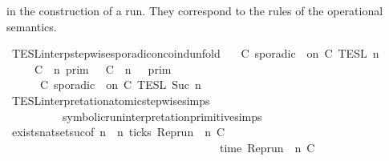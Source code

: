 \begin{isabellebody}
\begin{isamarkuptext}
  in the construction of a run. They correspond to the rules of the operational 
  semantics.%
\end{isamarkuptext}\isamarkuptrue%
\isamarkupfalse%
\ TESL{\isacharunderscore}interp{\isacharunderscore}stepwise{\isacharunderscore}sporadicon{\isacharunderscore}coind{\isacharunderscore}unfold{\isacharcolon}\isanewline
\ \ {\isacartoucheopen}{\isasymlbrakk}\ C\ sporadic\ {\isasymtau}\ on\ C\ {\isasymrbrakk}\isactrlsub T\isactrlsub E\isactrlsub S\isactrlsub L\isactrlbsup {\isasymge}\ n\isactrlesup \ {\isacharequal}\isanewline
\ \ \ \ {\isasymlbrakk}\ C\ {\isasymUp}\ n\ {\isasymrbrakk}\isactrlsub p\isactrlsub r\isactrlsub i\isactrlsub m\ {\isasyminter}\ {\isasymlbrakk}\ C\ {\isasymDown}\ n\ {\isacharat}\ {\isasymtau}\ {\isasymrbrakk}\isactrlsub p\isactrlsub r\isactrlsub i\isactrlsub m\ \ \ \ \ \ \ \ %
\isanewline
\ \ \ \ {\isasymunion}\ {\isasymlbrakk}\ C\ sporadic\ {\isasymtau}\ on\ C\ {\isasymrbrakk}\isactrlsub T\isactrlsub E\isactrlsub S\isactrlsub L\isactrlbsup {\isasymge}\ Suc\ n\isactrlesup {\isacartoucheclose}\ \ \ %
\isanewline
%
\isadelimproof
%
\endisadelimproof
%
\isatagproof
{}\isamarkupfalse%
\ TESL{\isacharunderscore}interpretation{\isacharunderscore}atomic{\isacharunderscore}stepwise{\isachardot}simps{\isacharparenleft}{}{\isacharparenright}\isanewline
\ \ \ \ \ \ \ \ \ \ symbolic{\isacharunderscore}run{\isacharunderscore}interpretation{\isacharunderscore}primitive{\isachardot}simps{\isacharparenleft}{}{\isacharcomma}{}{\isacharparenright}\isanewline
{}\isamarkupfalse%
\ exists{\isacharunderscore}nat{\isacharunderscore}set{\isacharunderscore}suc{\isacharbrackleft}of\ {\isacartoucheopen}n{\isacartoucheclose}\ {\isacartoucheopen}{\isasymlambda}{\isasymrho}\ n{\isachardot}\ ticks\ {\isacharparenleft}Rep{\isacharunderscore}run\ {\isasymrho}\ n\ C\isanewline
\ \ \ \ \ \ \ \ \ \ \ \ \ \ \ \ \ \ \ \ \ \ \ \ \ \ \ \ \ \ \ \ \ \ \ \ \ {\isasymand}\ time\ {\isacharparenleft}Rep{\isacharunderscore}run\ {\isasymrho}\ n\ C\ {\isacharequal}\ {\isasymtau}{\isacartoucheclose}{\isacharbrackright}\isanewline
{}\isamarkupfalse%

\end{isabellebody}
